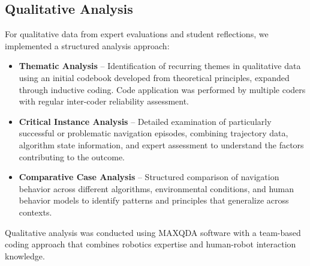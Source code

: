 \subsection{Qualitative Analysis}
\label{subsec:qualitative_analysis}
For qualitative data from expert evaluations and student reflections, we implemented a 
structured analysis approach:
\begin{itemize}
    \item \textbf{Thematic Analysis} -- Identification of recurring themes in qualitative data 
    using an initial codebook developed from theoretical principles, expanded through inductive 
    coding. Code application was performed by multiple coders with regular inter-coder 
    reliability assessment.
    \item \textbf{Critical Instance Analysis} -- Detailed examination of particularly successful 
    or problematic navigation episodes, combining trajectory data, algorithm state information, 
    and expert assessment to understand the factors contributing to the outcome.
    \item \textbf{Comparative Case Analysis} -- Structured comparison of navigation behavior 
    across different algorithms, environmental conditions, and human behavior models to identify 
    patterns and principles that generalize across contexts.
\end{itemize}
Qualitative analysis was conducted using MAXQDA software with a team-based coding 
approach that combines robotics expertise and human-robot interaction knowledge.


